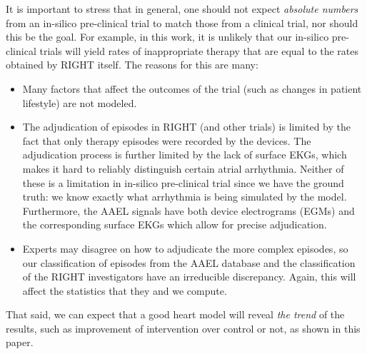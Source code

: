 It is important to stress that in general, one should not expect \emph{absolute numbers} from an in-silico pre-clinical trial to match those from a clinical trial, nor should this be the goal.
For example, in this work, it is unlikely that our in-silico pre-clinical trials will yield rates of inappropriate therapy that are equal to the rates obtained by RIGHT itself.
The reasons for this are many:
\begin{itemize}
	\item Many factors that affect the outcomes of the trial (such as changes in patient lifestyle) are not modeled.
	\item The adjudication of episodes in RIGHT (and other trials) is limited by the fact that only therapy episodes were recorded by the devices.
	The adjudication process is further limited by the lack of surface EKGs, which makes it hard to reliably distinguish certain atrial arrhythmia. 
	Neither of these is a limitation in in-silico pre-clinical trial since we have the ground truth: we know exactly what arrhythmia is being simulated by the model.  Furthermore, the AAEL signals have both device electrograms (EGMs) and the corresponding surface EKGs which allow for precise adjudication.  
	\item Experts may disagree on how to adjudicate the more complex episodes, so our classification of episodes from the AAEL database and the classification of the RIGHT investigators have an irreducible discrepancy.
	Again, this will affect the statistics that they and we compute.
\end{itemize}

That said, we can expect that a good heart model will reveal \emph{the trend} of the results, such as improvement of intervention over control or not, as shown in this paper. 
